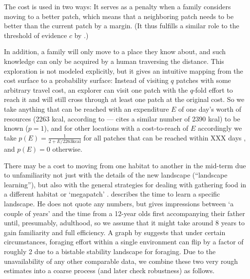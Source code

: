 \documentclass[a4paper,12pt]{scrartcl}
\begin{document}
The cost is used in two ways: It serves as a penalty when a family considers
moving to a better patch, which means that a neighboring patch needs to be
better than the current patch by a margin. (It thus fulfills a similar role to
the threshold of evidence $c$ by \textcite{crema2014simulation}.)

In addition, a family will only move to a place they know about, and such
knowledge can only be acquired by a human traversing the distance. This
exploration is not modeled explicitly, but it gives an intuitive mapping from
the cost surface to a probability surface: Instead of visiting $q$ patches with
some arbitrary travel cost, an explorer can visit one patch with the $q$-fold
effort to reach it and will still cross through at least one patch at the
original cost. So we take anything that can be reached with an expenditure $E$
of one day's worth of resources (2263 kcal, according to
\textcite{pontzer2012huntergatherer}---\textcite{smith2003assessment} cites a
similar number of 2390 kcal) to be known ($p=1$), and for other locations with a
cost-to-reach of $E$ accordingly we take $p(E) = \frac{1}{2 + E / {2263 \text{
      kcal}}}$ for all patches that can be reached within XXX days \parencite{},
and $p(E) = 0$ otherwise.

There may be a cost to moving from one habitat to another in the mid-term due to
unfamiliarity not just with the details of the new landscape (“landscape
learning”), but also with the general strategies for dealing with gathering food
in a different habitat or ‘megapatch’ \parencite{kelly2003colonization}.
\Textcite{kelly2003colonization} describes the time to learn a specific
landscape. He does not quote any numbers, but gives impressions between ‘a
couple of years’ and the time from a 12-year olds first accompanying their
father until, presumably, adulthood, so we assume that it might take around 8
years to gain familiarity and full efficiency. A graph by \Textcite[Fig.
4]{freeman2017theory} suggests that under certain circumstances, foraging effort
within a single environment can flip by a factor of roughly 2 due to a bistable
stability landscape for foraging. Due to the unavailability of any other
comparable data, we combine these two very rough estimates into a coarse process
(and later check robustness) as follows.
\end{document}
